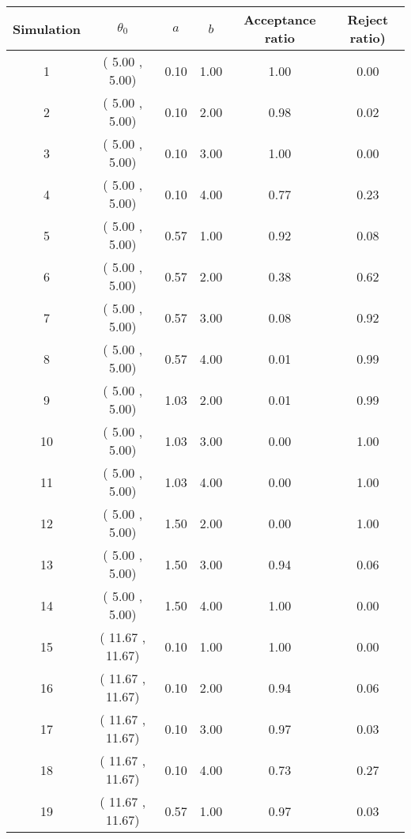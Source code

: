 \begin{center}
\begin{table}\label{tb: Simulation Metropolis}
\begin{tabular}{|cccccc|}\hline 
Simulation & $\theta_0$ & $a$ & $b$ & Acceptance ratio & Reject ratio)\\ \hline 
1 & (    5.00 ,     5.00) &     0.10 &     1.00 &     1.00 &     0.00 \\  \hline\hline 
2 & (    5.00 ,     5.00) &     0.10 &     2.00 &     0.98 &     0.02 \\  \hline
3 & (    5.00 ,     5.00) &     0.10 &     3.00 &     1.00 &     0.00 \\  \hline
4 & (    5.00 ,     5.00) &     0.10 &     4.00 &     0.77 &     0.23 \\  \hline
5 & (    5.00 ,     5.00) &     0.57 &     1.00 &     0.92 &     0.08 \\  \hline
6 & (    5.00 ,     5.00) &     0.57 &     2.00 &     0.38 &     0.62 \\  \hline
7 & (    5.00 ,     5.00) &     0.57 &     3.00 &     0.08 &     0.92 \\  \hline
8 & (    5.00 ,     5.00) &     0.57 &     4.00 &     0.01 &     0.99 \\  \hline
9 & (    5.00 ,     5.00) &     1.03 &     2.00 &     0.01 &     0.99 \\  \hline
10 & (    5.00 ,     5.00) &     1.03 &     3.00 &     0.00 &     1.00 \\  \hline
11 & (    5.00 ,     5.00) &     1.03 &     4.00 &     0.00 &     1.00 \\  \hline
12 & (    5.00 ,     5.00) &     1.50 &     2.00 &     0.00 &     1.00 \\  \hline
13 & (    5.00 ,     5.00) &     1.50 &     3.00 &     0.94 &     0.06 \\  \hline
14 & (    5.00 ,     5.00) &     1.50 &     4.00 &     1.00 &     0.00 \\  \hline
15 & (   11.67 ,    11.67) &     0.10 &     1.00 &     1.00 &     0.00 \\  \hline
16 & (   11.67 ,    11.67) &     0.10 &     2.00 &     0.94 &     0.06 \\  \hline
17 & (   11.67 ,    11.67) &     0.10 &     3.00 &     0.97 &     0.03 \\  \hline
18 & (   11.67 ,    11.67) &     0.10 &     4.00 &     0.73 &     0.27 \\  \hline
19 & (   11.67 ,    11.67) &     0.57 &     1.00 &     0.97 &     0.03 \\  \hline

\end{tabular}
\end{table}
\end{center}
